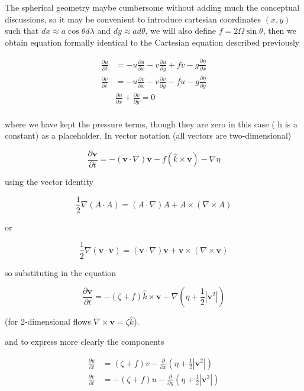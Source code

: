 The spherical geometry maybe cumbersome without adding much the
conceptual discussions, so it may be convenient to introduce cartesian
coordinates \((x,y)\) such that \(dx \approx a \cos\theta d \lambda\)
and \(dy \approx a d\theta\), we will also define
\(f= 2\Omega \sin\theta\), then we obtain equation formally identical to
the Cartesian equation described previously

\[\begin{aligned}
\frac{\partial u}{\partial t} &= -u \frac{\partial u}{\partial x} -v \frac{\partial u}{\partial y} + f v -g\frac{\partial \eta}{\partial x} \\
\frac{\partial v}{\partial t} &= -u \frac{\partial v}{\partial x} -v \frac{\partial v}{\partial y} - f u -g\frac{\partial \eta}{\partial y} \\
&\frac{\partial u}{\partial x}+\frac{\partial v}{\partial y} = 0 \\
\end{aligned}\]

where we have kept the pressure terms, though they are zero in this case
( h is a constant) as a placeholder. In vector notation (all vectors are
two-dimensional)

\[\frac{\partial \mathbf{v}}{\partial t} = - (\mathbf{v} \cdot \nabla)\mathbf{v} - f(\hat{k}\times \mathbf{v}) - \nabla \eta\]

using the vector identity

\[\frac{1}{2}\nabla(A\cdot A) = (A \cdot\nabla)A + A\times(\nabla\times A)\]

or

\[\frac{1}{2}\nabla(\mathbf{v}\cdot \mathbf{v}) = (\mathbf{v} \cdot\nabla)\mathbf{v} + \mathbf{v}\times(\nabla\times \mathbf{v})\]

so substituting in the equation

\[\frac{\partial \mathbf{v}}{\partial t} = -(\zeta + f) \hat{k}\times \mathbf{v} -\nabla(\eta+\frac{1}{2}|\mathbf{v}^2|)\]

(for 2-dimensional flows \(\nabla \times \mathbf{v} = \zeta \hat{k}\)).

and to express more clearly the components

\[\begin{aligned}
\frac{\partial u}{\partial t} &= (\zeta +f) v -\frac{\partial }{\partial x}(\eta+\frac{1}{2}|\mathbf{v}^2|)\\
\frac{\partial v}{\partial t} &= -(\zeta +f) u -\frac{\partial }{\partial y}(\eta+\frac{1}{2}|\mathbf{v}^2|)
\end{aligned}\]

